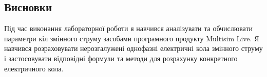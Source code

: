 \documentclass{article}
\begin{document}
\begin{normalsize}
	\section*{Висновки}
	Під час виконання лабораторної роботи я навчився аналізувати та обчислювати параметри кіл змінного струму засобами програмного продукту Multisim Live. Я навчився розраховувати нерозгалужені однофазні електричні кола змінного струму і застосовувати відповідні формули та методи для розрахунку конкретного електричного кола.
	    
\end{normalsize}
\end{document}
